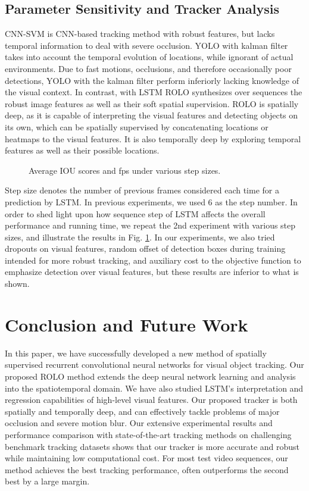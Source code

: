 \documentclass{article}
\begin{document}
\subsection{Parameter Sensitivity and Tracker Analysis}
CNN-SVM is CNN-based tracking method with robust features, but lacks temporal information to deal with severe occlusion.
YOLO with kalman filter takes into account the temporal evolution of locations, while ignorant of actual environments. Due to fast motions, occlusions, and therefore occasionally poor detections, YOLO with the kalman filter perform inferiorly lacking knowledge of the visual context.
In contrast, with LSTM ROLO synthesizes over sequences the robust image features as well as their soft spatial supervision.
ROLO is spatially deep, as it is capable of interpreting the visual features and detecting objects on its own, which can be spatially supervised by concatenating locations or heatmaps to the visual features. It is also temporally deep by exploring temporal features as well as their possible locations.
\begin{figure}[!ht]
	\centering
	\caption{Average IOU scores and fps under various step sizes.}
	\label{fig-steps}
\end{figure}
Step size
denotes the number of previous frames considered each time for a prediction by LSTM. In previous experiments, we used 6 as the step number.
In order to shed light upon how sequence step of LSTM affects the overall performance and running time, we repeat the 2nd experiment with various step sizes, and illustrate the results in Fig. \ref{fig-steps}.
In our experiments, we also tried dropouts on visual features, random offset of detection boxes during training intended for more robust tracking, and auxiliary cost to the objective function to emphasize detection over visual features, but these results are inferior to what is shown.

\section{Conclusion and Future Work}

In this paper, we have successfully developed a new method of spatially supervised recurrent convolutional neural networks for visual object tracking.  Our proposed ROLO method extends the deep neural network learning and analysis into the spatiotemporal domain.
We have also studied LSTM's interpretation and regression capabilities of high-level visual features. Our proposed tracker is both spatially and temporally deep, and can effectively tackle problems of major occlusion and severe motion blur.
Our extensive experimental results and performance comparison with state-of-the-art tracking methods on challenging benchmark tracking datasets shows that our tracker is more accurate and robust while maintaining low computational cost. For most test video sequences, our method achieves the best tracking performance, often outperforms the second best by a large margin.
\end{document}
